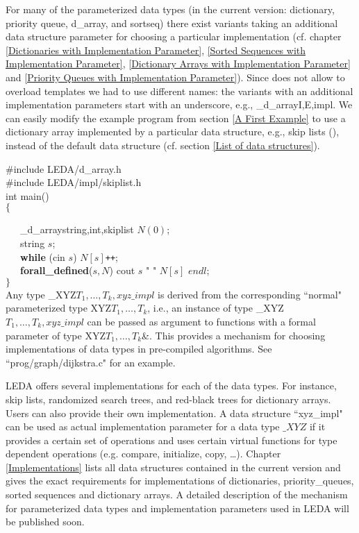 \label{Implementation Parameters}
For many of the parameterized data types (in the current version: dictionary, 
priority queue, d\_array, and sortseq) there exist variants taking an additional
data structure parameter for choosing a particular implementation 
(cf. chapter \ref{Dictionaries with Implementation Parameter},
\ref{Sorted Sequences with Implementation Parameter},
\ref{Dictionary Arrays with Implementation Parameter}
and \ref{Priority Queues with Implementation Parameter}). Since \CC
does not
allow to overload templates we had 
to use different names: the variants with an additional implementation 
parameters start with an underscore, e.g., \_d\_array\<I,E,impl\>. 
We can easily modify the example program from section \ref{A First Example} 
to use a dictionary 
array implemented by a particular data structure, e.g., skip lists (\cite{Pu90}), 
instead of the default data structure (cf. section \ref{List of data structures}). 
\medskip

\#include \<LEDA/d\_array.h\>\\
\#include \<LEDA/impl/skiplist.h\>\\
\smallskip
int main()\\
$\{$

\ \ \ \_d\_array\<string,int,skiplist\> $N(0)$;\\
\smallskip
\ \ \ string $s$;\\
\smallskip
\ \ \ {\bf while} (cin \>\> $s$) $N[s]${\tt ++};\\
\smallskip
\ \ \ {\bf forall\_defined}($s,N$) 
                cout \<\< $s$ \<\< " " \<\< $N[s]$ \<\< $endl$;\\
\smallskip
$\}$\\

Any type \_XYZ\<$T_1,\dots,T_k,xyz\_impl$\> is derived from the corresponding
``normal" parameterized type XYZ\<$T_1,\dots,T_k$\>, i.e., an instance of type 
\_XYZ\<$T_1,\dots,T_k,xyz\_impl$\> can be passed as argument to functions with
a formal parameter of type XYZ\<$T_1,\dots,T_k$\>\&. 
This provides a mechanism
for choosing implementations of data types in pre-compiled algorithms.
See ``prog/graph/dijkstra.c" for an example.

LEDA offers several implementations for each of the data types. For
instance, skip lists, randomized search trees, and red-black trees
for dictionary arrays. Users can also provide their own implementation. 
A data structure ``xyz\_impl" can be used as actual
implementation parameter for a data type $\_XYZ$ if it provides a 
certain set of operations and uses certain virtual functions for type 
dependent operations (e.g. compare, initialize, copy, \dots).
Chapter \ref{Implementations} lists all data structures contained in the current version and 
gives the exact requirements for implementations of 
dictionaries, priority\_queues, sorted sequences and dictionary arrays.
A detailed description of the mechanism for parameterized data types and 
implementation parameters used in LEDA will be published soon.


